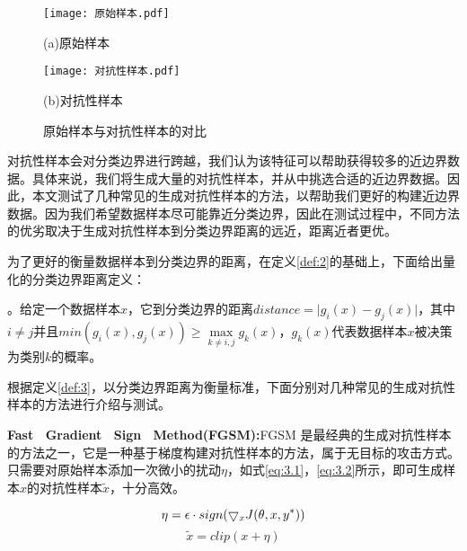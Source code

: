 \begin{figure}[htbp]%
	\setlength{\abovecaptionskip}{5mm} %
	\vspace{-2mm}
	\setlength{\belowcaptionskip}{-3mm} %
	\begin{minipage}[t]{1\linewidth}        %
		\centering
		\texttt{[image: 原始样本.pdf]}
		\centerline{(a)原始样本}
	\end{minipage}
	\begin{minipage}[t]{1\linewidth}        %
		\centering
		\texttt{[image: 对抗性样本.pdf]}
		\centerline{(b)对抗性样本}
	\end{minipage}
\caption{原始样本与对抗性样本的对比}
\label{原始样本与对抗性样本对比}
\end {figure}

对抗性样本会对分类边界进行跨越，我们认为该特征可以帮助获得较多的近边界数据。具体来说，我们将生成大量的对抗性样本，并从中挑选合适的近边界数据。因此，本文测试了几种常见的生成对抗性样本的方法，以帮助我们更好的构建近边界数据。因为我们希望数据样本尽可能靠近分类边界，因此在测试过程中，不同方法的优劣取决于生成对抗性样本到分类边界距离的远近，距离近者更优。

为了更好的衡量数据样本到分类边界的距离，在定义\ref{def:2}的基础上，下面给出量化的分类边界距离定义：

\begin{myDef}
	\label{def:3}
	。给定一个数据样本$x$，它到分类边界的距离$distance = \vert g_i(x) - g_j(x) \vert$，其中$i \neq j $并且$min(g_i(x), g_j(x)) \geq \mathop{max} \limits_{k \neq i, j}g_k(x)$，$g_k(x)$代表数据样本$x$被决策为类别$k$的概率。
\end{myDef}

根据定义\ref{def:3}，以分类边界距离为衡量标准，下面分别对几种常见的生成对抗性样本的方法进行介绍与测试。


\noindent\textbf{Fast \ Gradient \ Sign \ Method(FGSM):}FGSM \cite{goodfellow2014explaining}是最经典的生成对抗性样本的方法之一，它是一种基于梯度构建对抗性样本的方法，属于无目标的攻击方式。只需要对原始样本添加一次微小的扰动$\eta$，如式\ref{eq:3.1}，\ref{eq:3.2}所示，即可生成样本$x$的对抗性样本$\tilde{x}$，十分高效。

\begin{equation}
	 	\setlength\abovedisplayshortskip{-5mm}
	\label{eq:3.1}
	\eta = \epsilon \cdot sign(\bigtriangledown_xJ(\theta,x,y^*))
\end{equation}
\begin{equation}
	\label{eq:3.2}
	\tilde{x} = clip(x + \eta)
\end{equation}

